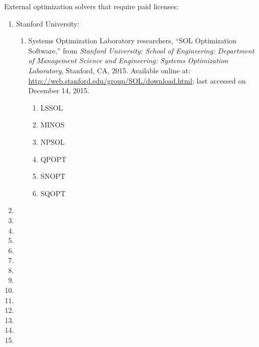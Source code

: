 External optimization solvers that require paid licenses: \vspace{-0.3cm}
\begin{enumerate} \itemsep -4pt
\item Stanford University: \vspace{-0.3cm}
	\begin{enumerate} \itemsep -2pt
	\item Systems Optimization Laboratory researchers, ``SOL Optimization Software,'' from {\it Stanford University: School of Engineering: Department of Management Science and Engineering: Systems Optimization Laboratory}, Stanford, CA, 2015. Available online at: \url{http://web.stanford.edu/group/SOL/download.html}; last accessed on December 14, 2015. \vspace{-0.2cm}
		\begin{enumerate} \itemsep -2pt
		\item LSSOL
		\item MINOS
		\item NPSOL
		\item QPOPT
		\item SNOPT
		\item SQOPT
		\end{enumerate}
	\end{enumerate}
\item 
\item 
\item 
\item 
\item 
\item 
\item 
\item 
\item 
\item 
\item 
\item 
\item 
\item 
\end{enumerate}












